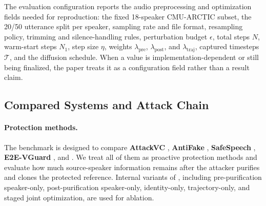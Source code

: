 The evaluation configuration reports the audio preprocessing and optimization fields needed for reproduction: 
the fixed 18-speaker CMU-ARCTIC subset, the 20/50 utterance split per speaker, sampling rate and file format, resampling policy, trimming and silence-handling rules, perturbation budget $\epsilon$, 
total steps $N$, warm-start steps $N_1$, step size $\eta$, weights $\lambda_{\text{pre}}$, $\lambda_{\text{post}}$, and $\lambda_{\text{traj}}$, captured timesteps $\mathcal{T}$, and the diffusion schedule. 
When a value is implementation-dependent or still being finalized, the paper treats it as a configuration field rather than a result claim.

\subsection{Compared Systems and Attack Chain}

\paragraph{Protection methods.}
The benchmark is designed to compare \textbf{AttackVC} \cite{huang2021attackvc}, \textbf{AntiFake} \cite{yu2023antifake}, 
\textbf{SafeSpeech} \cite{zhang2025safespeech}, \textbf{E2E-VGuard} \cite{zhang2025e2evguard}, and \method. 
We treat all of them as proactive protection methods and evaluate how much source-speaker information remains after the attacker purifies and clones the protected reference. 
Internal variants of \method, including pre-purification speaker-only, post-purification speaker-only, identity-only, trajectory-only, and staged joint optimization, are used for ablation.

